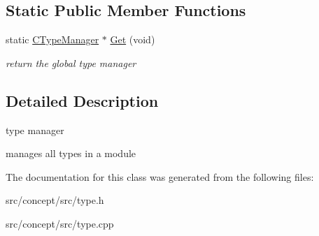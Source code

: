 \subsection*{Static Public Member Functions}
\begin{DoxyCompactItemize}
\item 
\hypertarget{classCTypeManager_a7a6f5f8332a8570b6369faf38aa3b589}{static \hyperlink{classCTypeManager}{C\-Type\-Manager} $\ast$ \hyperlink{classCTypeManager_a7a6f5f8332a8570b6369faf38aa3b589}{Get} (void)}\label{classCTypeManager_a7a6f5f8332a8570b6369faf38aa3b589}

\begin{DoxyCompactList}\small\item\em return the global type manager \end{DoxyCompactList}\end{DoxyCompactItemize}


\subsection{Detailed Description}
type manager 

manages all types in a module 

The documentation for this class was generated from the following files\-:\begin{DoxyCompactItemize}
\item 
src/concept/src/type.\-h\item 
src/concept/src/type.\-cpp\end{DoxyCompactItemize}
